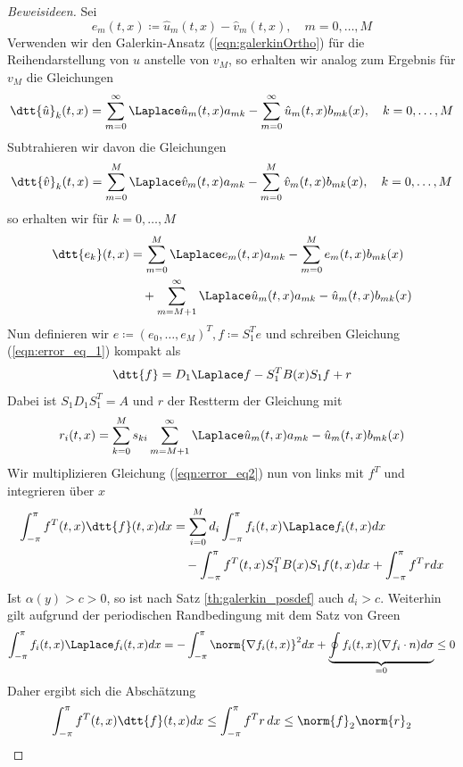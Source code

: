 \begin{proof}[Beweisideen]
Sei 
\[e_m(t,x)\coloneqq \hat{u}_m(t,x)-\hat{v}_m(t,x),\quad m=0,\dots,M\]
Verwenden wir den Galerkin-Ansatz (\ref{eqn:galerkinOrtho}) für die Reihendarstellung von $u$ anstelle von $v_M$, so erhalten wir analog zum Ergebnis für $v_M$ die Gleichungen
\begin{equation}
\dtt{\hat{u}}_k(t,x)=\sum_{m=0}^\infty \Laplace \hat{u}_m(t,x)a_{mk}-\sum_{m=0}^\infty \hat{u}_m(t,x)b_{mk}(x),\quad k=0,\dots,M
\end{equation}
Subtrahieren wir davon die Gleichungen
\begin{equation}
\dtt{\hat{v}}_k(t,x)=\sum_{m=0}^M\Laplace \hat{v}_m(t,x)a_{mk}-\sum_{m=0}^M\hat{v}_m(t,x)b_{mk}(x),\quad k=0,\dots,M
\end{equation}
so erhalten wir für $k=0,\dots,M$
\begin{equation}
\label{eqn:error_eq_1}
\begin{split}
\dtt{e_k}(t,x)&=\sum_{m=0}^M\Laplace e_m(t,x)a_{mk}-\sum_{m=0}^M e_m(t,x)b_{mk}(x)\\
&\quad +\sum_{m=M+1}^\infty \Laplace \hat{u}_m(t,x)a_{mk}-\hat{u}_m(t,x)b_{mk}(x)
\end{split}
\end{equation}
Nun definieren wir $e\coloneqq (e_0,\dots,e_M)^T, f\coloneqq S_1^Te$ und schreiben Gleichung (\ref{eqn:error_eq_1}) kompakt als
\begin{equation}
\label{eqn:error_eq2}
\dtt{f}=D_1\Laplace f-S_1^TB(x)S_1f+r
\end{equation}
Dabei ist $S_1D_1S_1^T=A$ und $r$ der Restterm der Gleichung mit
\[r_{i}(t,x)=\sum_{k=0}^Ms_{ki}\sum_{m=M+1}^\infty \Laplace \hat{u}_m(t,x)a_{mk}-\hat{u}_m(t,x)b_{mk}(x)\]
Wir multiplizieren Gleichung (\ref{eqn:error_eq2}) nun von links mit $f^T$ und integrieren über $x$
\begin{align*}
\int_{-\pi}^\pi f^T(t,x)\dtt{f}(t,x)dx&=\sum_{i=0}^M d_i\int_{-\pi}^\pi f_i(t,x)\Laplace f_i(t,x)dx\\
&\quad -\int_{-\pi}^\pi f^T(t,x)S_1^TB(x)S_1f(t,x)dx+\int_{-\pi}^\pi f^Trdx
\end{align*}
Ist $\alpha(y)>c>0$, so ist nach Satz \ref{th:galerkin_posdef} auch $d_i>c$. Weiterhin gilt aufgrund der periodischen Randbedingung mit dem Satz von Green
\[\int_{-\pi}^\pi f_i(t,x)\Laplace f_i(t,x)dx=-\int_{-\pi}^\pi \norm{\nabla f_i(t,x)}^2dx+\underbrace{\oint f_i(t,x)(\nabla f_i\cdot n)d\sigma}_{=0}\le 0\]
Daher ergibt sich die Abschätzung
\begin{equation}
\int_{-\pi}^\pi f^T(t,x)\dtt{f}(t,x)dx\le \int_{-\pi}^\pi f^Tr\,dx\le \norm{f}_2\norm{r}_2 
\end{equation}
\end{proof}
